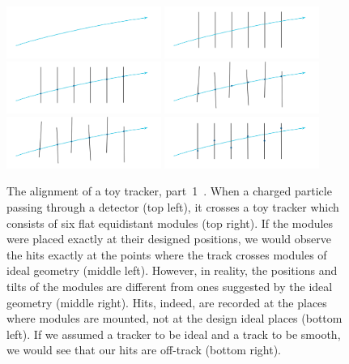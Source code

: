 \begin{figure}[htb]
    \begin{center}
        \includegraphics[width=0.45\textwidth]{../figs/Alignment/toyTracker01.png}
        \includegraphics[width=0.45\textwidth]{../figs/Alignment/toyTracker02.png}
        \includegraphics[width=0.45\textwidth]{../figs/Alignment/toyTracker03.png}
        \includegraphics[width=0.45\textwidth]{../figs/Alignment/toyTracker04.png}
        \includegraphics[width=0.45\textwidth]{../figs/Alignment/toyTracker05.png}
        \includegraphics[width=0.45\textwidth]{../figs/Alignment/toyTracker06.png}
    \end{center}
    \caption{The alignment of a toy tracker, part~1~\cite{ref_Frank_presentation}. When a charged particle passing through a detector (top left), it crosses a toy tracker which consists of six flat equidistant modules (top right). If the modules were placed exactly at their designed positions, we would observe the hits exactly at the points where the track crosses modules of ideal geometry (middle left). However, in reality, the positions and tilts of the modules are different from ones suggested by the ideal geometry (middle right). Hits, indeed, are recorded at the places where modules are mounted, not at the design ideal places (bottom left). If we assumed a tracker to be ideal and a track to be smooth, we would see that our hits are off-track (bottom right).}
    \label{fig:toyTracker_part1}
\end{figure}

